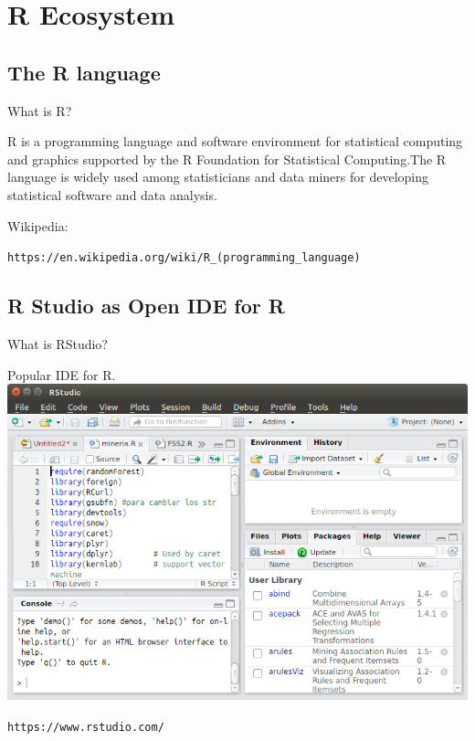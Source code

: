 \documentclass{beamer}
\begin{document}
\section{R Ecosystem}


\subsection[R language]{The R language}


\begin{frame}{What is R?} %

R is a programming language and software environment for statistical computing and graphics supported by the R Foundation for Statistical Computing.The R language is widely used among statisticians and data miners for developing statistical software and data analysis.

Wikipedia: 

\begin{footnotesize}
\texttt{https://en.wikipedia.org/wiki/R\_(programming\_language)}                                                                 \end{footnotesize}


\end{frame}


\subsection[R Studio]{R Studio as Open IDE for R}


\begin{frame}{What is RStudio?} %

Popular IDE for R.
\includegraphics[height=.50\textwidth]{figs/RStudio.png}

\texttt{https://www.rstudio.com/}

\end{frame}
\end{document}
